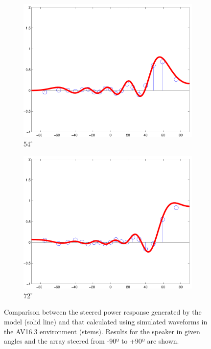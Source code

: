 \documentclass[spanish,openright]{book}
\begin{document}
\begin{figure}
\begin{subfigure}[b]{0.3\textwidth}
\includegraphics[width=\textwidth]{Sim_seg025_ang144}
\caption{$54^{\circ}$}
\label{fig:Sim_ang144}
\end{subfigure}


\begin{subfigure}[b]{0.3\textwidth}
\includegraphics[width=\textwidth]{Sim_seg025_ang162}
\caption{$72^{\circ}$}
\label{fig:Sim_ang162}
\end{subfigure}

\caption{Comparison between the steered power response generated
by the model (solid line) and that calculated using simulated
waveforms in the AV16.3 environment (stems). Results for the
speaker in given angles and the array steered from -90º to
+90º are shown.}
\label{fig:Sim_angles}
\end{figure}
\end{document}
